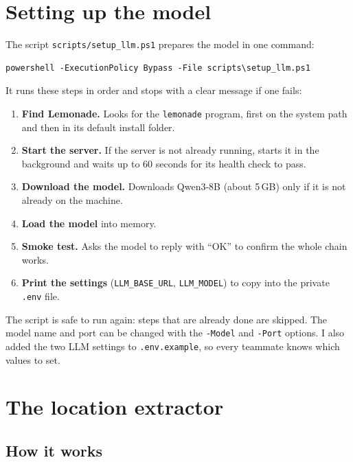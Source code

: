 \documentclass[11pt,a4paper]{article}
\newcommand{\code}[1]{\texttt{#1}}
\begin{document}
\section{Setting up the model}

The script \code{scripts/setup\_llm.ps1} prepares the model in one command:

\begin{lstlisting}
powershell -ExecutionPolicy Bypass -File scripts\setup_llm.ps1
\end{lstlisting}

It runs these steps in order and stops with a clear message if one fails:

\begin{enumerate}
  \item \textbf{Find Lemonade.} Looks for the \code{lemonade} program, first on the system path and then in its default install folder.
  \item \textbf{Start the server.} If the server is not already running, starts it in the background and waits up to 60 seconds for its health check to pass.
  \item \textbf{Download the model.} Downloads Qwen3-8B (about 5\,GB) only if it is not already on the machine.
  \item \textbf{Load the model} into memory.
  \item \textbf{Smoke test.} Asks the model to reply with ``OK'' to confirm the whole chain works.
  \item \textbf{Print the settings} (\code{LLM\_BASE\_URL}, \code{LLM\_MODEL}) to copy into the private \code{.env} file.
\end{enumerate}

The script is safe to run again: steps that are already done are skipped. The
model name and port can be changed with the \code{-Model} and \code{-Port}
options. I also added the two LLM settings to \code{.env.example}, so every
teammate knows which values to set.

\section{The location extractor}\label{sec:locate}

\subsection{How it works}
\end{document}
